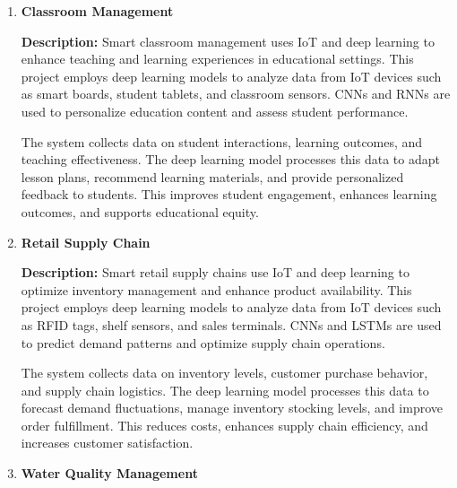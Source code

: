 \documentclass{article}
\begin{document}
\begin{enumerate}[label=\textbf{\arabic*.}, leftmargin=*]
\vspace{24pt} %
\item \textbf{Classroom Management}

\textbf{Description:}
Smart classroom management uses IoT and deep learning to enhance teaching and learning experiences in educational settings. This project employs deep learning models to analyze data from IoT devices such as smart boards, student tablets, and classroom sensors. CNNs and RNNs are used to personalize education content and assess student performance.

The system collects data on student interactions, learning outcomes, and teaching effectiveness. The deep learning model processes this data to adapt lesson plans, recommend learning materials, and provide personalized feedback to students. This improves student engagement, enhances learning outcomes, and supports educational equity.



\vspace{24pt} %
\item \textbf{Retail Supply Chain}

\textbf{Description:}
Smart retail supply chains use IoT and deep learning to optimize inventory management and enhance product availability. This project employs deep learning models to analyze data from IoT devices such as RFID tags, shelf sensors, and sales terminals. CNNs and LSTMs are used to predict demand patterns and optimize supply chain operations.

The system collects data on inventory levels, customer purchase behavior, and supply chain logistics. The deep learning model processes this data to forecast demand fluctuations, manage inventory stocking levels, and improve order fulfillment. This reduces costs, enhances supply chain efficiency, and increases customer satisfaction.



\vspace{24pt} %
\item \textbf{Water Quality Management}


\end{enumerate}
\end{document}

